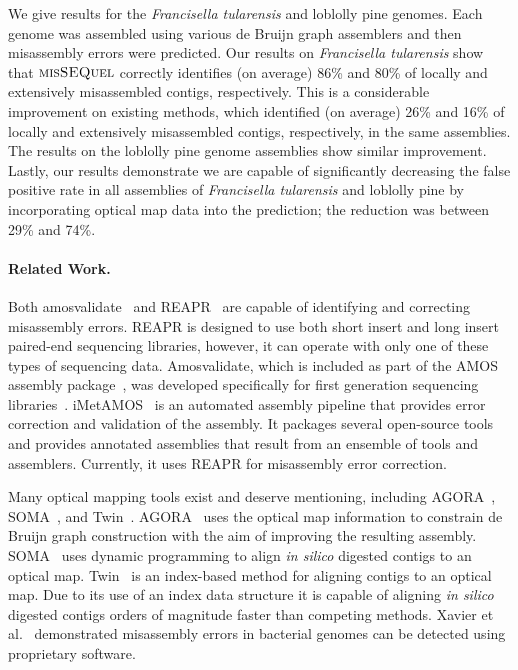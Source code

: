 We give results for the {\em Francisella tularensis} and loblolly pine genomes.  Each genome was assembled using various de Bruijn graph assemblers and then misassembly errors were predicted.  Our results on {\em Francisella tularensis} show that $\mbox{\rm {\sc misSEQuel}}$ correctly identifies (on average) 86\% and 80\% of locally and extensively misassembled contigs, respectively. This is a considerable improvement on existing methods, which identified (on average)  26\% and 16\% of locally and extensively misassembled contigs, respectively, in the same assemblies. The results on the loblolly pine genome assemblies show similar improvement. Lastly, our results demonstrate we are capable of significantly decreasing the false positive rate in all assemblies of {\em Francisella tularensis} and loblolly pine by incorporating optical map data into the prediction; the reduction was between 29\% and 74\%.  

\paragraph{Related Work.}  
Both amosvalidate~\cite{amos} and REAPR~\cite{reapr} are capable of identifying and correcting misassembly errors.  
REAPR is designed to use both short insert and long insert paired-end sequencing libraries, however, it can operate with only one of these types of sequencing data.  
Amosvalidate, which is included as part of the AMOS assembly package~\cite{amos2}, was developed specifically for first generation sequencing libraries~\cite{amos}. 
iMetAMOS~\cite{iMetAMOS} is an automated assembly pipeline that provides error correction and validation of the assembly.  
It packages several open-source tools and provides annotated assemblies that result from an ensemble of tools and assemblers.  
Currently, it uses REAPR for misassembly error correction. 
 
Many optical mapping tools exist and deserve mentioning, including AGORA~\cite{agora}, SOMA~\cite{soma}, and Twin~\cite{wabi2014}. AGORA~\cite{agora} uses the optical map information to constrain de Bruijn graph construction with the aim of improving the resulting assembly.   SOMA~\cite{soma} uses dynamic programming to align {\em in silico} digested contigs to an optical map.   Twin~\cite{wabi2014} is an index-based method for aligning contigs to an optical map. Due to its use of an index data structure it is capable of aligning {\em in silico} digested contigs orders of magnitude faster than competing methods.     Xavier et al.~\cite{om_mis} demonstrated misassembly errors in bacterial genomes can be detected using proprietary software.

